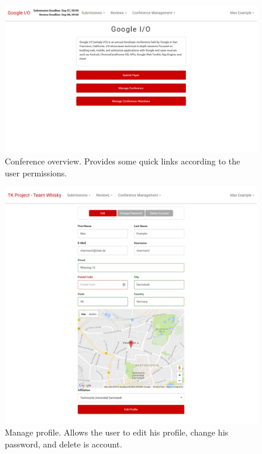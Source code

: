 \documentclass[nochapterpage,nopartpage,noheadingspace,numbersubsubsec,bigchapter,colorback,accentcolor=tud9c,10pt]{tudreport}
\begin{document}
        \begin{figure}[!ht]
            \centering
            \includegraphics[width=\textwidth]{img/ui-conference-home}
            \caption{Conference overview. Provides some quick links according to the user permissions.}
            \label{fig:appendix:screenshots:ui-conference-home}
        \end{figure}

        \begin{figure}[!ht]
            \centering
            \includegraphics[width=\textwidth]{img/ui-manage-profile}
            \caption{Manage profile. Allows the user to edit his profile, change his password, and delete is account.}
            \label{fig:appendix:screenshots:ui-manage-profile}
        \end{figure}
\end{document}
